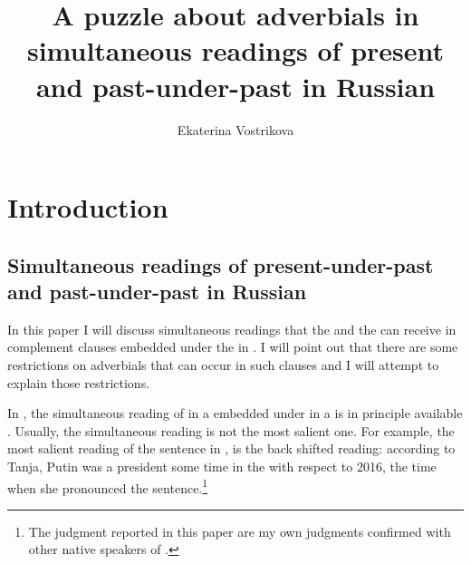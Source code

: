 \documentclass[output=paper,modfonts,newtxmath,hidelinks]{langscibook}
\title{A puzzle about adverbials in simultaneous readings of present and past-under-past in Russian}
\author{ Ekaterina Vostrikova\affiliation{University of Massachusetts, Amherst}}
\begin{document}
\maketitle
{}






\section{Introduction}\label{20:s1}
\subsection{Simultaneous readings of present-under-past and past-under-past in Russian}\label{20:s1.1}

In this paper I will discuss simultaneous readings that the  and the  can receive in complement clauses embedded under the  in . I will point out that there are some restrictions on adverbials that can occur in such clauses and I will attempt to explain those restrictions.

In , the simultaneous reading of  in a  embedded under  in a  is in principle available \citep{Altshuler2008}. Usually, the simultaneous reading is not the most salient one. For example, the most salient reading of the sentence in , is the back shifted reading: according to Tanja, Putin was a president some time in the  with respect to 2016, the time when she pronounced the sentence.\footnote{\label{20:fn2}The  judgment reported in this paper are my own judgments confirmed with other native speakers of .}
\end{document}
